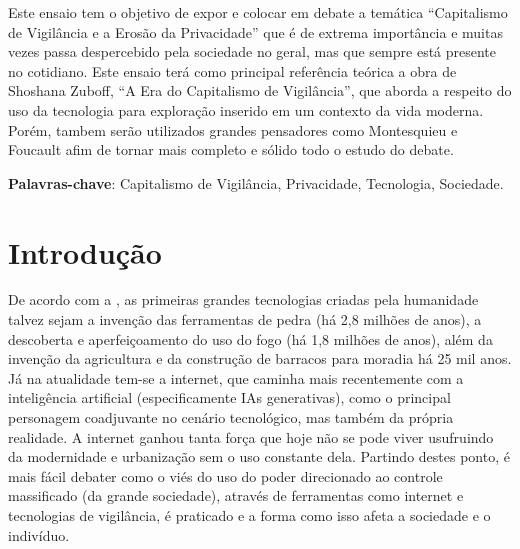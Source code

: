 \documentclass[
	12pt,
	openright,
	twoside,
	a4paper,
	english,
	french,
	spanish,
	brazil
]{abntex2}
\begin{document}
  \frenchspacing
  \imprimircapa
  \imprimirfolhaderosto*

  \setlength{\absparsep}{18pt}
  \begin{resumo}
    Este ensaio tem o objetivo de expor e colocar em debate a temática
    ``Capitalismo de Vigilância e a Erosão da Privacidade'' que é de extrema
    importância e muitas vezes passa despercebido pela sociedade no geral, mas
    que sempre está presente no cotidiano. Este ensaio terá como principal
    referência teórica a obra de Shoshana Zuboff, ``A Era do Capitalismo de
    Vigilância'', que aborda a respeito do uso da tecnologia para exploração
    inserido em um contexto da vida moderna. Porém, tambem serão utilizados
    grandes pensadores como Montesquieu e Foucault afim de tornar mais completo
    e sólido todo o estudo do debate.

    \textbf{Palavras-chave}:
      Capitalismo de Vigilância, Privacidade, Tecnologia, Sociedade.
  \end{resumo}


  \textual

  \chapter{Introdução}

  De acordo com a , as primeiras grandes tecnologias
  criadas pela humanidade talvez sejam a invenção das ferramentas de pedra (há
  2,8 milhões de anos), a descoberta e aperfeiçoamento do uso do fogo (há 1,8
  milhões de anos), além da invenção da agricultura e da construção de barracos
  para moradia há 25 mil anos. Já na atualidade tem-se a internet, que caminha
  mais recentemente com a inteligência artificial (especificamente IAs
  generativas), como o principal personagem coadjuvante no cenário tecnológico,
  mas também da própria realidade. A internet ganhou tanta força que hoje não se
  pode viver usufruindo da modernidade e urbanização sem o uso constante dela.
  Partindo destes ponto, é mais fácil debater como o viés do uso do poder
  direcionado ao controle massificado (da grande sociedade), através de
  ferramentas como internet e tecnologias de vigilância, é praticado e a forma
  como isso afeta a sociedade e o indivíduo.
\end{document}
